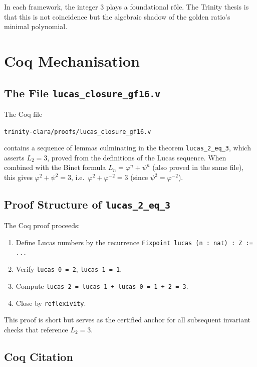 In each framework, the integer $3$ plays a foundational r\^{o}le.
The Trinity thesis is that this is not coincidence but the
algebraic shadow of the golden ratio's minimal polynomial.


\section{Coq Mechanisation}\label{sec:coq-mechanisation}

\subsection{The File \texttt{lucas\_closure\_gf16.v}}

The Coq file
\begin{center}
\texttt{trinity-clara/proofs/lucas\_closure\_gf16.v}
\end{center}
contains a sequence of lemmas culminating in the theorem
\texttt{lucas\_2\_eq\_3}, which asserts $L_{2} = 3$,
proved from the definitions of the Lucas sequence.
When combined with the Binet formula
$L_{n} = \varphi^{n}+\psi^{n}$ (also proved in the same file),
this gives $\varphi^{2}+\psi^{2}=3$, i.e.\
$\varphi^{2}+\varphi^{-2}=3$ (since $\psi^{2}=\varphi^{-2}$).

\subsection{Proof Structure of \texttt{lucas\_2\_eq\_3}}

The Coq proof proceeds:
\begin{enumerate}
  \item Define Lucas numbers by the recurrence
        \texttt{Fixpoint lucas (n : nat) : Z := ...}
  \item Verify \texttt{lucas 0 = 2}, \texttt{lucas 1 = 1}.
  \item Compute \texttt{lucas 2 = lucas 1 + lucas 0 = 1 + 2 = 3}.
  \item Close by \texttt{reflexivity}.
\end{enumerate}

This proof is short but serves as the certified anchor for all
subsequent invariant checks that reference $L_{2}=3$.

\subsection{Coq Citation}

